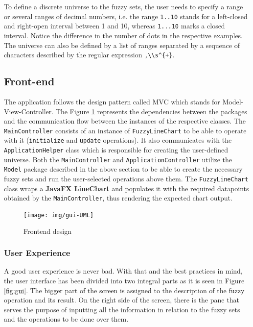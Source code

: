 \documentclass[12pt,a4paper,titlepage,final]{article}
\begin{document}
To define a discrete universe to the fuzzy sets, the user needs to specify a range or several ranges of decimal numbers, i.e. the range \texttt{1..10} stands for a left-closed and right-open interval between 1 and 10, whereas \texttt{1...10} marks a closed interval. Notice the difference in the number of dots in the respective examples. The universe can also be defined by a list of ranges separated by a sequence of characters described by the regular expression \verb|,\\s^{+}|.

\subsection{Front-end} \label{ui}
The application follows the design pattern called MVC which stands for Model-View-Controller. The Figure \ref{fig:guiUML} represents the dependencies between the packages and the communication flow between the instances of the respective classes. The \texttt{MainController} consists of an instance of \texttt{FuzzyLineChart} to be able to operate with it (\verb|initialize| and \verb|update| operations). It also communicates with the \texttt{ApplicationHelper} class which is responsible for creating the user-defined universe. Both the \texttt{MainController} and \texttt{ApplicationController} utilize the \texttt{Model} package described in the above section to be able to create the necessary fuzzy sets and run the user-selected operations above them. The \texttt{FuzzyLineChart} class wraps a \textbf{JavaFX LineChart} and populates it with the required datapoints obtained by the \texttt{MainController}, thus rendering the expected chart output.

\noindent
\begin{figure}[h]
\centering
\texttt{[image: img/gui-UML]}
\caption{Frontend design}
\label{fig:guiUML}
\end{figure}

\subsubsection{User Experience}
A good user experience is never bad. With that and the best practices in mind, the user interface has been divided into two integral parts as it is seen in Figure \ref{fig:gui}. The bigger part of the screen is assigned to the description of the fuzzy operation and its result. On the right side of the screen, there is the pane that serves the purpose of inputting all the information in relation to the fuzzy sets and the operations to be done over them.
\end{document}
